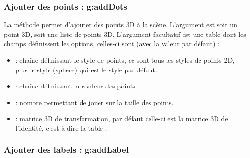 \subsubsection{Ajouter des points : g:addDots}

La méthode  permet d'ajouter des points 3D à la scène. L'argument  est soit un point 3D, soit une liste de points 3D. L'argument facultatif  est une table dont les champs définissent les options, celles-ci sont (avec la valeur par défaut) :
\begin{itemize}
        \item {} : chaîne définissant le style de points, ce sont tous les styles de points 2D, plus le style  (sphère) qui est le style par défaut. 
    \item {} : chaîne définissant la couleur des points.
    \item {} : nombre permettant de jouer sur la taille des points.
    \item {} : matrice 3D de transformation, par défaut celle-ci est la matrice 3D de l'identité, c'est à dire la table .
\end{itemize}

\subsubsection{Ajouter des labels : g:addLabel}

